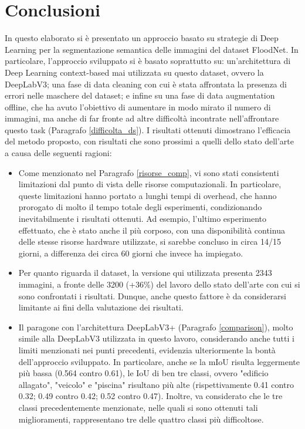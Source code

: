 \chapter{Conclusioni}
\label{chap_conclusion}
In questo elaborato si è presentato un approccio basato su strategie di Deep Learning per la segmentazione semantica delle immagini del dataset FloodNet. In particolare, l'approccio sviluppato si è basato soprattutto su: un'architettura di Deep Learning context-based mai utilizzata su questo dataset, ovvero la DeepLabV3; una fase di data cleaning con cui è stata affrontata la presenza di errori nelle maschere del dataset; e infine su una fase di data augmentation offline, che ha avuto l'obiettivo di aumentare in modo mirato il numero di immagini, ma anche di far fronte ad altre difficoltà incontrate nell'affrontare questo task (Paragrafo \ref{difficolta_ds}). I risultati ottenuti dimostrano l'efficacia del metodo proposto, con risultati che sono prossimi a quelli dello stato dell'arte a causa delle seguenti ragioni:

\begin{itemize}
    \item Come menzionato nel Paragrafo \ref{risorse_comp}, vi sono stati consistenti limitazioni dal punto di vista delle risorse computazionali. In particolare, queste limitazioni hanno portato a lunghi tempi di overhead, che hanno prorogato di molto il tempo totale degli esperimenti, condizionando inevitabilmente i risultati ottenuti. Ad esempio, l'ultimo esperimento effettuato, che è stato anche il più corposo, con una disponibilità continua delle stesse risorse hardware utilizzate, si sarebbe concluso in circa 14/15 giorni, a differenza dei circa 60 giorni che invece ha impiegato.
    
    
    \item Per quanto riguarda il dataset, la versione qui utilizzata presenta 2343 immagini, a fronte delle 3200 (+36\%) del lavoro dello stato dell'arte con cui si sono confrontati i risultati. Dunque, anche questo fattore è da considerarsi limitante ai fini della valutazione dei risultati.
    
    
    \item  Il paragone con l'architettura DeepLabV3+ (Paragrafo \ref{comparison}), molto simile alla DeepLabV3 utilizzata in questo lavoro, considerando anche tutti i limiti menzionati nei punti precedenti, evidenzia ulteriormente la bontà dell'approccio sviluppato. In particolare, anche se la mIoU risulta leggermente più bassa (0.564 contro 0.61), le IoU di ben tre classi, ovvero "edificio allagato", "veicolo" e "piscina" risultano più alte (rispettivamente 0.41 contro 0.32; 0.49 contro 0.42; 0.52 contro 0.47). Inoltre, va considerato che le tre classi precedentemente menzionate, nelle quali si sono ottenuti tali miglioramenti, rappresentano tre delle quattro classi più difficoltose.
    
\end{itemize}


